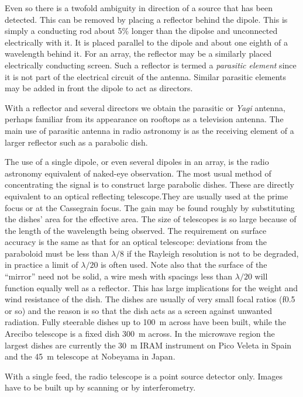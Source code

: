 \documentclass{article}
\begin{document}
Even so there is a twofold ambiguity in direction of a source that has been detected. 
This can be removed by placing a reflector behind the dipole. This is simply a conducting rod 
about 5\% longer than the dipolse and unconnected electrically with it. It
is placed parallel to the dipole and about one eighth of a wavelength behind
it. For an array, the reflector may be a similarly placed electrically 
conducting screen. Such a reflector is termed a {\it parasitic element} since it is not part 
of the electrical circuit of the antenna. Similar parasitic elements may be added in front 
the dipole to act as directors.

With a reflector and several directors we obtain the parasitic or {\it Yagi} antenna, perhaps 
familiar from its appearance on rooftops as a television antenna. The main use of parasitic
antenna in radio astronomy is as the receiving element of a larger reflector such as a parabolic
dish.

The use of a single dipole, or even several dipoles in an array, is the
radio astronomy equivalent of naked-eye observation. The most usual method
of concentrating the signal is to construct large parabolic dishes. These
are directly equivalent to an optical reflecting telescope.They are
usually used at the prime focus or at the Cassegrain focus. The gain may 
be found roughly by substituting the dishes' area for the effective area. 
The size of telescopes is so large because of the length of the wavelength
being observed. The requirement on surface accuracy is the same as that for
an optical telescope: deviations from the paraboloid must be less than 
$\lambda/8$ if the Rayleigh resolution is not to be degraded, in practice a
limit of $\lambda/20$ is often used. Note also that the surface of the 
``mirror'' need not be solid, a wire mesh with spacings less than $\lambda/20$
will function equally well as a reflector. This has large implications for the
weight and wind resistance of the dish. The dishes are usually of very 
small focal ratios (f0.5 or so) and the reason is so that the dish acts
as a screen against unwanted radiation. Fully steerable dishes up to 100~m
across have been built, while the Arecibo telescope is a fixed dish 300~m 
across. In the microwave region the largest dishes are currently the 30~m IRAM
instrument on Pico Veleta in Spain and the 45~m telescope at Nobeyama in Japan.

With a single feed, the radio telescope is a point source detector only. 
Images have to be built up by scanning or by interferometry. 
\end{document}

